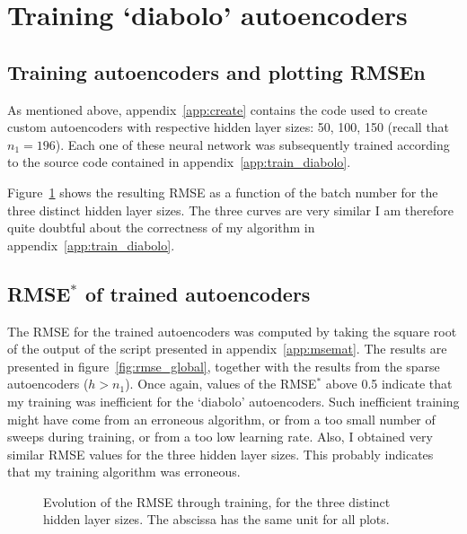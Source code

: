 \documentclass{article}
\begin{document}
\section*{Training {\color{blue}`diabolo'} autoencoders}
{ \color{blue}
\subsection*{Training autoencoders and plotting RMSEn}
As mentioned above, 
appendix~\ref{app:create} contains the code used to create custom autoencoders with respective hidden layer sizes: 50, 100, 150 (recall that $n_1=196$). Each one of these neural network was subsequently trained according to the source code contained in appendix~\ref{app:train_diabolo}.

Figure~\ref{fig:mse_diabolo} shows the resulting RMSE as a function of the batch number for the three distinct hidden layer sizes. 
The three curves are very similar I am therefore quite doubtful about the correctness of my algorithm in appendix~\ref{app:train_diabolo}.

\subsection*{RMSE$^*$ of trained autoencoders}
The RMSE for the trained autoencoders was computed by taking the square root of the output of the script presented in appendix~\ref{app:msemat}. The results are presented in figure~\ref{fig:rmse_global}, together with the results from the sparse autoencoders ($h>n_1$). Once again, values of the RMSE$^*$ above 0.5 indicate that my training was inefficient for the `diabolo' autoencoders. Such inefficient training might have come from an erroneous algorithm, or from a too small number of sweeps during training, or from a too low learning rate. Also, I obtained very similar RMSE values for the three hidden layer sizes. This probably indicates that my training algorithm was erroneous.
}
\begin{figure}[bth!]
\centering
{}
\caption{{\color{blue}Evolution of the RMSE through training, for the three distinct hidden layer sizes. The abscissa has the same unit for all plots.}}\label{fig:mse_diabolo}
\end{figure}
\end{document}
